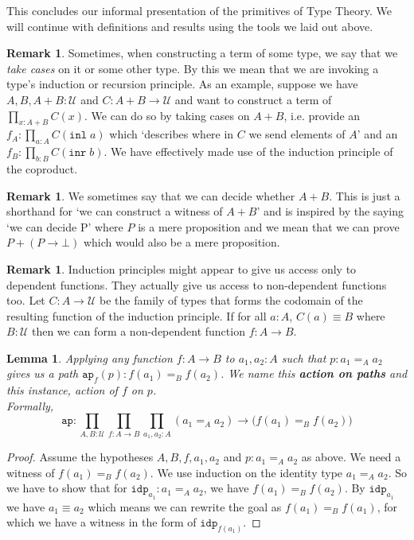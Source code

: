 \documentclass[12pt]{report}
\newtheorem{lem}[thm]{Lemma}
\theoremstyle{definition}
\newtheorem{rem}[thm]{Remark}
\begin{document}
This concludes our informal presentation of the primitives of Type Theory. 
We will continue with definitions and results using the tools we laid out above. 
\begin{rem}
Sometimes, when constructing a term of some type, we say that we \textit{take cases} on it or some other type. 
By this we mean that we are invoking a type's induction or recursion principle. 
As an example, suppose we have $A, B, A+B : \mathcal{U}$ and $C : A +B \rightarrow \mathcal{U}$ and want to construct a term of $\prod_{x :A+B} C(x)$. 
We can do so by taking cases on $A+B$, i.e. provide an $f_A : \prod_{a :A}C(\mathtt{inl}\; a)$ which `describes where in $C$ we send elements of $A$' and an $f_B : \prod_{b :B}C(\mathtt{inr}\; b)$. 
We have effectively made use of the induction principle of the coproduct. 
\end{rem}
\begin{rem}
We sometimes say that we can decide whether $A+B$. 
This is just a shorthand for `we can construct a witness of $A+B$' and is inspired by the saying `we can decide P' where $P$ is a mere proposition and we mean that we can prove $P + (P \rightarrow \bot)$ which would also be a mere proposition. 
\end{rem}
\begin{rem}
Induction principles might appear to give us access only to dependent functions. 
They actually give us access to non-dependent functions too. 
Let $C : A \rightarrow \mathcal{U}$ be the family of types that forms the codomain of the resulting function of the induction principle. 
If for all $a : A$, $C(a) \equiv B$ where $B  :\mathcal{U}$ then we can form a non-dependent function $f : A \rightarrow B$. 
\end{rem}

\begin{lem}
Applying any function $f : A\rightarrow B$ to $a_1, a_2 : A$ such that $p : a_1 =_A a_2$ gives us a path $\mathtt{ap}_f (p) : f(a_1) =_B f(a_2)$. 
We name this \textbf{action on paths} and this instance, action of $f$ on $p$.\\
Formally,
$$\mathtt{ap} : \prod_{A,B : \mathcal{U}}\prod_{f : A \rightarrow B}\prod_{a_1,a_2 : A}(a_1 =_A a_2)\rightarrow \big(f(a_1) =_B f(a_2)\big)$$
\end{lem}
\begin{proof}
Assume the hypotheses $A,B,f, a_1, a_2$ and $p : a_1 =_A a_2$ as above. 
We need a witness of $f(a_1) =_B f(a_2)$. 
We use induction on the identity type $a_1 =_A a_2$. 
So we have to show that for $\mathtt{idp}_{a_1} : a_1 =_A a_2$, we have $f(a_1) =_B f(a_2)$. 
By $\mathtt{idp}_{a_1}$ we have $a_1 \equiv a_2$ which means we can rewrite the goal as $f(a_1) =_B f(a_1)$, for which we have a witness in the form of $\mathtt{idp}_{f(a_1)}$. 
\end{proof}
\end{document}
